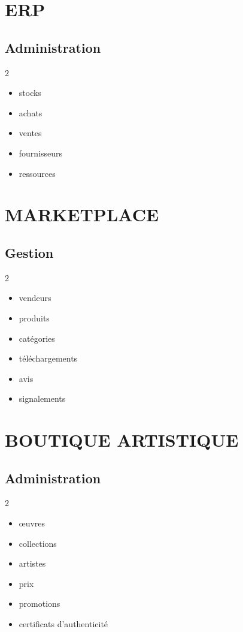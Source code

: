 \documentclass[12pt,a4paper,oneside]{book}
\begin{document}
\chapter{ERP}

\section{Administration}
\begin{multicols}{2}
\begin{itemize}
\item stocks
\item achats
\item ventes
\item fournisseurs
\item ressources
\end{itemize}
\end{multicols}

\chapter{MARKETPLACE}

\section{Gestion}
\begin{multicols}{2}
\begin{itemize}
\item vendeurs
\item produits
\item catégories
\item téléchargements
\item avis
\item signalements
\end{itemize}
\end{multicols}

\chapter{BOUTIQUE ARTISTIQUE}

\section{Administration}
\begin{multicols}{2}
\begin{itemize}
\item œuvres
\item collections
\item artistes
\item prix
\item promotions
\item certificats d'authenticité
\end{itemize}
\end{multicols}
\end{document}
